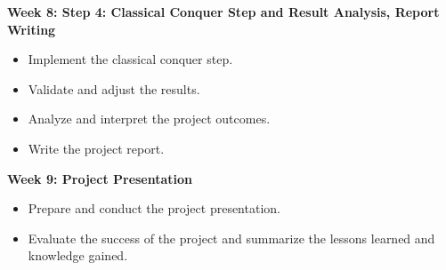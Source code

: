 \documentclass[12pt]{article}
\begin{document}
\textbf{Week 8: Step 4: Classical Conquer Step and Result Analysis, Report Writing}
\begin{itemize}
    \item Implement the classical conquer step.
    \item Validate and adjust the results.
    \item Analyze and interpret the project outcomes.
    \item Write the project report.
\end{itemize}

\textbf{Week 9: Project Presentation}
\begin{itemize}
    \item Prepare and conduct the project presentation.
    \item Evaluate the success of the project and summarize the lessons learned and knowledge gained.
\end{itemize}


  
 
\end{document}
